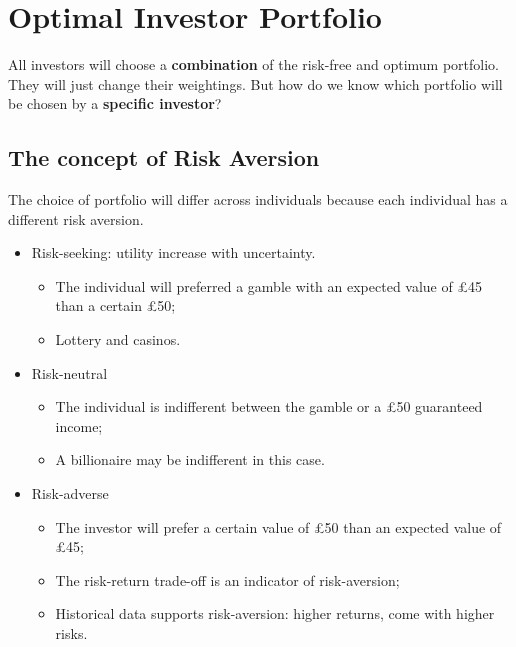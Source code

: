 \documentclass[11pt,a4paper]{report}
\begin{document}
\section{Optimal Investor Portfolio}
All investors will choose a \textbf{combination} of the risk-free and optimum portfolio. They will just change their weightings. But how do we know which portfolio will be chosen by a \textbf{specific investor}?
\subsection{The concept of Risk Aversion}
The choice of portfolio will differ across individuals because each individual has a different risk aversion.
\begin{itemize}
    \item Risk-seeking: utility increase with uncertainty.
    \begin{itemize}
        \item The individual will preferred a gamble with an expected value of £45 than a certain £50;
        \item Lottery and casinos.
    \end{itemize}
    \item Risk-neutral
    \begin{itemize}
        \item The individual is indifferent between the gamble or a £50 guaranteed income;
        \item A billionaire may be indifferent in this case.
    \end{itemize}
    \item Risk-adverse
    \begin{itemize}
        \item The investor will prefer a certain value of £50 than an expected value of £45;
        \item The risk-return trade-off is an indicator of risk-aversion;
        \item Historical data supports risk-aversion: higher returns, come with higher risks.
    \end{itemize}
\end{itemize}
\end{document}

